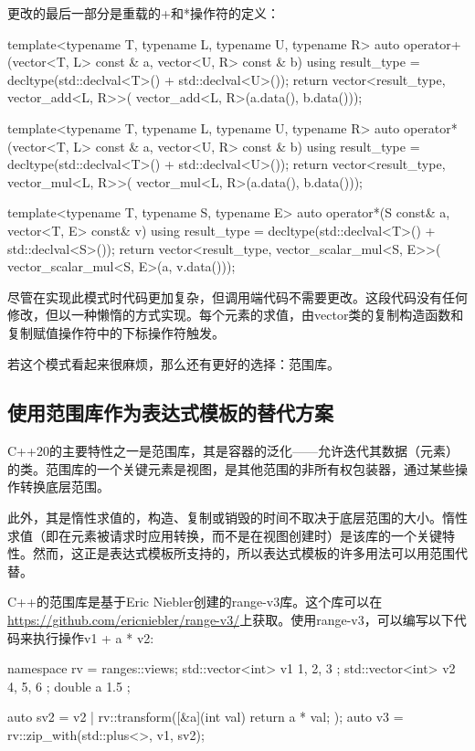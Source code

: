 更改的最后一部分是重载的+和*操作符的定义：

\begin{cpp}
template<typename T, typename L, typename U, typename R>
auto operator+(vector<T, L> const & a,
vector<U, R> const & b)
{
	using result_type = decltype(std::declval<T>() +
								 std::declval<U>());
	return vector<result_type, vector_add<L, R>>(
		vector_add<L, R>(a.data(), b.data()));
}

template<typename T, typename L, typename U, typename R>
auto operator*(vector<T, L> const & a,
vector<U, R> const & b)
{
	using result_type = decltype(std::declval<T>() +
								 std::declval<U>());
	return vector<result_type, vector_mul<L, R>>(
		vector_mul<L, R>(a.data(), b.data()));
}

template<typename T, typename S, typename E>
auto operator*(S const& a, vector<T, E> const& v)
{
	using result_type = decltype(std::declval<T>() +
								 std::declval<S>());
	return vector<result_type, vector_scalar_mul<S, E>>(
		vector_scalar_mul<S, E>(a, v.data()));
}
\end{cpp}

尽管在实现此模式时代码更加复杂，但调用端代码不需要更改。这段代码没有任何修改，但以一种懒惰的方式实现。每个元素的求值，由vector类的复制构造函数和复制赋值操作符中的下标操作符触发。

若这个模式看起来很麻烦，那么还有更好的选择：范围库。

\subsection{使用范围库作为表达式模板的替代方案}

C++20的主要特性之一是范围库，其是容器的泛化——允许迭代其数据（元素）的类。范围库的一个关键元素是视图，是其他范围的非所有权包装器，通过某些操作转换底层范围。

此外，其是惰性求值的，构造、复制或销毁的时间不取决于底层范围的大小。惰性求值（即在元素被请求时应用转换，而不是在视图创建时）是该库的一个关键特性。然而，这正是表达式模板所支持的，所以表达式模板的许多用法可以用范围代替。

C++的范围库是基于Eric Niebler创建的range-v3库。这个库可以在\url{https://github.com/ericniebler/range-v3/}上获取。使用range-v3，可以编写以下代码来执行操作v1 + a * v2:

\begin{cpp}
namespace rv = ranges::views;
std::vector<int> v1{ 1, 2, 3 };
std::vector<int> v2{ 4, 5, 6 };
double a { 1.5 };

auto sv2 = v2 |
		   rv::transform([&a](int val) {return a * val; });
auto v3 = rv::zip_with(std::plus<>{}, v1, sv2);
\end{cpp}

